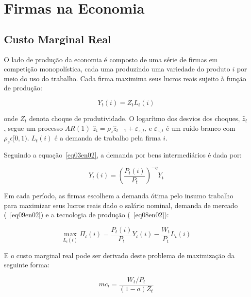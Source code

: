 \documentclass[twoside,a4paper,11pt]{report}
\begin{document}
\section*{Firmas na Economia}

\subsection*{Custo Marginal Real}

O lado de produção da economia é composto de uma série de firmas em competição monopolística, cada uma produzindo uma variedade do produto $i$ por meio do uso do trabalho. Cada firma maximima seus lucros reais sujeito à função de produção:

\begin{equation}\label{eq08en02}
Y_{t}(i)=Z_{t}L_{t}(i)
\end{equation}

\noindent onde $Z_{t}$ denota choque de produtividade. O logarítmo dos desvios dos choques, ${\hat{z}}_{t}$, segue um processo $AR(1)$ ${\hat{z}}_{t}={\rho}_{z}{\hat{z}}_{t-1}+{ \varepsilon}_{z,t}$, e ${\varepsilon}_{z,t}$ é um ruído branco com ${\rho}_{z}\epsilon [0,1)$. $L_{t}(i)$ é a demanda de trabalho pela firma $i$. 

Seguindo a equação~\ref{eq03en02}, a demanda por bens intermediários é dada por:

\begin{equation}\label{eq09en02}
{ Y }_{ t }(i)={ \left( \frac { { P }_{ t }(i) }{ { P }_{ t } }  \right)  }^{ -\eta  }{ Y }_{ t }
\end{equation}

Em cada período, as firmas escolhem a demanda ótima pelo insumo trabalho para maximizar seus lucros reais dado o salário nominal, demanda de mercado (~\ref{eq09en02}) e a tecnologia de produção (~\ref{eq08en02}):

\begin{equation}\label{eq10en02}
\max _{ { L }_{ t }(i) }{ { { \Pi  }_{ t }(i) } } =\frac { { P }_{ t }(i) }{ { P }_{ t } } { Y }_{ t }(i)-\frac { { W }_{ t } }{ { P }_{ t } } { L }_{ t }(i)
\end{equation}

E o custo marginal real pode ser derivado deste problema de maximização da seguinte forma:

\begin{equation}\label{eq11en02}
{ mc }_{ t }=\frac { { { W }_{ t } }/{ { P }_{ t } } }{ \left( 1-a \right) { Z }_{ t } } 
\end{equation}
\end{document}
